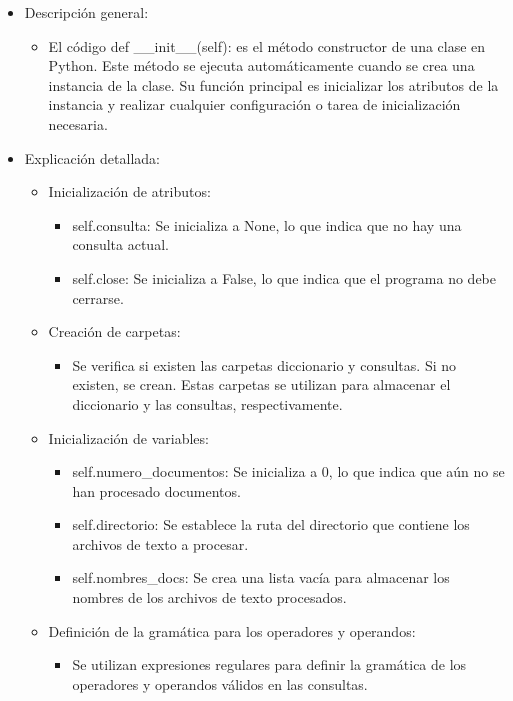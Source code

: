 \begin{itemize}
  \item Descripción general:
  \begin{itemize}
    \item El código def \_\_init\_\_(self): es el método constructor de una clase en Python. Este método se ejecuta automáticamente cuando se crea una instancia de la clase. Su función principal es inicializar los atributos de la instancia y realizar cualquier configuración o tarea de inicialización necesaria.
  \end{itemize}
  \item Explicación detallada:
  \begin{itemize}
    \item Inicialización de atributos:
    \begin{itemize}
      \item self.consulta: Se inicializa a None, lo que indica que no hay una consulta actual.
      \item self.close: Se inicializa a False, lo que indica que el programa no debe cerrarse.
    \end{itemize}
    \item Creación de carpetas:
    \begin{itemize}
      \item Se verifica si existen las carpetas diccionario y consultas. Si no existen, se crean. Estas carpetas se utilizan para almacenar el diccionario y las consultas, respectivamente.
    \end{itemize}
    \item Inicialización de variables:
    \begin{itemize}
      \item self.numero\_documentos: Se inicializa a 0, lo que indica que aún no se han procesado documentos.
      \item self.directorio: Se establece la ruta del directorio que contiene los archivos de texto a procesar.
      \item self.nombres\_docs: Se crea una lista vacía para almacenar los nombres de los archivos de texto procesados.
    \end{itemize}
    \item Definición de la gramática para los operadores y operandos:
    \begin{itemize}
      \item Se utilizan expresiones regulares para definir la gramática de los operadores y operandos válidos en las consultas.

\end{itemize}
\end{itemize}
\end{itemize}
